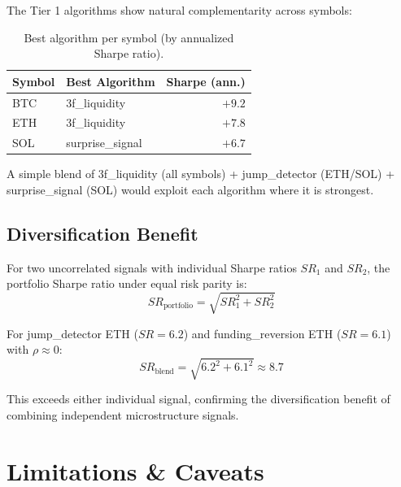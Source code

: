 \documentclass[11pt,a4paper]{article}
\newcommand{\toprule}{\hline\hline}
\newcommand{\midrule}{\hline}
\newcommand{\bottomrule}{\hline\hline}
\begin{document}
The Tier 1 algorithms show natural complementarity across symbols:

\begin{table}[h!]
\centering
\caption{Best algorithm per symbol (by annualized Sharpe ratio).}
\begin{tabular}{@{}llr@{}}
\toprule
Symbol & Best Algorithm & Sharpe (ann.) \\
\midrule
BTC & 3f\_liquidity & $+9.2$ \\
ETH & 3f\_liquidity & $+7.8$ \\
SOL & surprise\_signal & $+6.7$ \\
\bottomrule
\end{tabular}
\end{table}

A simple blend of 3f\_liquidity (all symbols) + jump\_detector (ETH/SOL) + surprise\_signal (SOL) would exploit each algorithm where it is strongest.

\subsection{Diversification Benefit}

For two uncorrelated signals with individual Sharpe ratios $SR_1$ and $SR_2$, the portfolio Sharpe ratio under equal risk parity is:
\begin{equation}
SR_{\text{portfolio}} = \sqrt{SR_1^2 + SR_2^2}
\end{equation}

For jump\_detector ETH ($SR = 6.2$) and funding\_reversion ETH ($SR = 6.1$) with $\rho \approx 0$:
\begin{equation}
SR_{\text{blend}} = \sqrt{6.2^2 + 6.1^2} \approx 8.7
\end{equation}

This exceeds either individual signal, confirming the diversification benefit of combining independent microstructure signals.

\section{Limitations \& Caveats}
\end{document}
